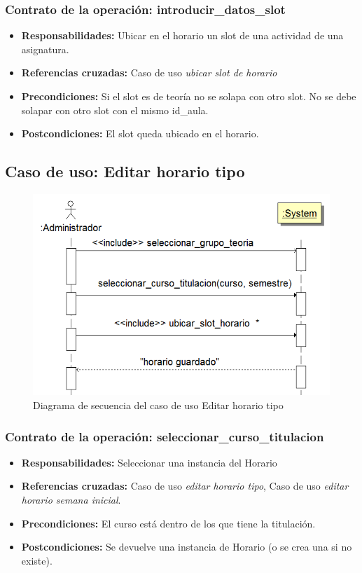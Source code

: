 \documentclass{book}
\begin{document}
\subsubsection{Contrato de la operación: introducir\_datos\_slot}
\begin{itemize}
\item {\bf Responsabilidades:} Ubicar en el horario un slot de una actividad de una asignatura.
\item {\bf Referencias cruzadas:} Caso de uso {\em ubicar slot de horario}
\item {\bf Precondiciones:} Si el slot es de teoría no se solapa con otro slot. No se debe solapar con otro slot con el mismo id\_aula.
\item {\bf Postcondiciones:} El slot queda ubicado en el horario.
\end{itemize}

\subsection{Caso de uso: Editar horario tipo}
\begin{figure}[H] 
  \label{comportamiento-editar-tipo} 
	\begin{center}
    \includegraphics[scale=0.5]{./secuencia-editar-tipo.png}
  \end{center}
\caption{Diagrama de secuencia del caso de uso Editar horario tipo}
\end{figure}

\subsubsection{Contrato de la operación: seleccionar\_curso\_titulacion}
\begin{itemize}
\item {\bf Responsabilidades:} Seleccionar una instancia del Horario
\item {\bf Referencias cruzadas:} Caso de uso {\em editar horario tipo}, Caso de uso {\em editar horario semana inicial}.
\item {\bf Precondiciones:} El curso está dentro de los que tiene la titulación.
\item {\bf Postcondiciones:} Se devuelve una instancia de Horario (o se crea una si no existe).
\end{itemize}
\end{document}
